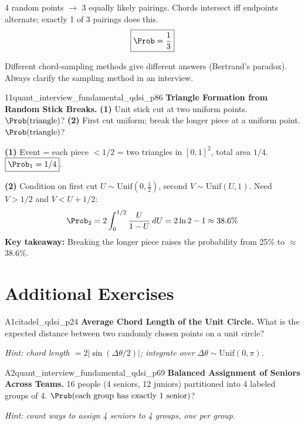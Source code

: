 \documentclass[11pt]{article}
\begin{document}
\begin{solutionbox}
4 random points $\to$ 3 equally likely pairings. Chords intersect iff endpoints
alternate; exactly 1 of 3 pairings does this.
\[
  \boxed{\Prob = \frac{1}{3}}
\]
\begin{warningbox}
Different chord-sampling methods give different answers (Bertrand's paradox).
Always clarify the sampling method in an interview.
\end{warningbox}
\end{solutionbox}

\begin{premiumproblem}{11}{\premiumlabel}{}{quant\_interview\_fundamental\_qdsi\_p86}
\textbf{Triangle Formation from Random Stick Breaks.}
\textbf{(1)} Unit stick cut at two uniform points. $\Prob(\text{triangle})$?
\textbf{(2)} First cut uniform; break the longer piece at a uniform point. $\Prob(\text{triangle})$?
\end{premiumproblem}

\begin{solutionbox}
\textbf{(1)} Event = each piece $<1/2$ = two triangles in $[0,1]^2$, total area $1/4$.
$\boxed{\Prob_1=1/4}$.

\textbf{(2)} Condition on first cut $U\sim\mathrm{Unif}(0,\tfrac{1}{2})$, second
$V\sim\mathrm{Unif}(U,1)$. Need $V>1/2$ and $V<U+1/2$:
\[
  \Prob_2 = 2\int_0^{1/2}\frac{U}{1-U}\,dU = 2\ln2-1\approx38.6\%
\]
\textbf{Key takeaway:} Breaking the longer piece raises the probability from
25\% to $\approx$38.6\%.
\end{solutionbox}

\section{Additional Exercises}

\begin{premiumproblem}{A1}{\premiumlabel}{}{citadel\_qdsi\_p24}
\textbf{Average Chord Length of the Unit Circle.}
What is the expected distance between two randomly chosen points on a unit circle?

\textit{Hint: chord length $= 2|\sin(\Delta\theta/2)|$; integrate over $\Delta\theta\sim\mathrm{Unif}(0,\pi)$.}
\end{premiumproblem}

\vspace{4pt}

\begin{premiumproblem}{A2}{\premiumlabel}{}{quant\_interview\_fundamental\_qdsi\_p69}
\textbf{Balanced Assignment of Seniors Across Teams.}
16 people (4 seniors, 12 juniors) partitioned into 4 labeled groups of 4.
$\Prob(\text{each group has exactly 1 senior})$?

\textit{Hint: count ways to assign 4 seniors to 4 groups, one per group.}
\end{premiumproblem}
\end{document}
